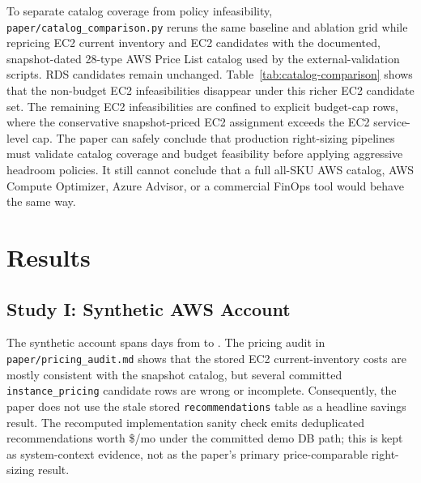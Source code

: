 \documentclass[conference]{IEEEtran}
\begin{document}
To separate catalog coverage from policy infeasibility,
\texttt{paper/catalog\_comparison.py} reruns the same baseline and ablation
grid while repricing EC2 current inventory and EC2 candidates with the
documented, snapshot-dated 28-type AWS Price List catalog used by the
external-validation scripts. RDS candidates remain unchanged.
Table~\ref{tab:catalog-comparison} shows that
the non-budget EC2 infeasibilities disappear under this richer EC2 candidate
set. The remaining EC2 infeasibilities are confined to explicit budget-cap
rows, where the conservative snapshot-priced EC2 assignment exceeds the EC2
service-level cap. The paper can safely
conclude that production right-sizing pipelines must validate catalog coverage
and budget feasibility before applying aggressive headroom policies. It still
cannot conclude that a full all-SKU AWS catalog, AWS Compute Optimizer, Azure
Advisor, or a commercial FinOps tool would behave the same way.













\section{Results}

\subsection{Study I: Synthetic AWS Account}
The synthetic account spans \nDays{} days from \dataStart{} to \dataEnd{}.
The pricing audit in \texttt{paper/pricing\_audit.md} shows that the stored
EC2 current-inventory costs are mostly consistent with the snapshot catalog,
but several committed \texttt{instance\_pricing} candidate rows are wrong or
incomplete. Consequently, the paper does not use the stale stored
\texttt{recommendations} table as a headline savings result. The recomputed
implementation sanity check emits \evidRuleRecs{} deduplicated recommendations
worth \$\evidRuleSavings{}/mo under the committed demo DB path; this is kept
as system-context evidence, not as the paper's primary price-comparable
right-sizing result.
\end{document}
